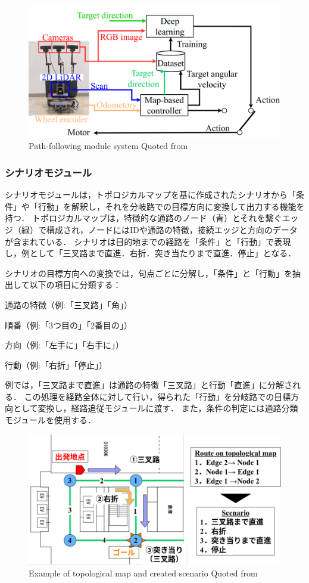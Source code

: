 \begin{figure}[htbp]
  \centering
   \includegraphics[width=130mm]{images/pdf/haruyama/pathfollow_sys.pdf}
   \caption{Path-following module system Quoted from \cite{haruyama2023}}
   \label{fig:pathfollow}
\end{figure}

\subsubsection{シナリオモジュール}
シナリオモジュールは，トポロジカルマップを基に作成されたシナリオから「条件」や「行動」を解釈し，それを分岐路での目標方向に変換して出力する機能を持つ．
トポロジカルマップは，特徴的な通路のノード（青）とそれを繋ぐエッジ（緑）で構成され，ノードにはIDや通路の特徴，接続エッジと方向のデータが含まれている．
シナリオは目的地までの経路を「条件」と「行動」で表現し，例として「三叉路まで直進．右折．突き当たりまで直進．停止」となる．

シナリオの目標方向への変換では，句点ごとに分解し，「条件」と「行動」を抽出して以下の項目に分類する：

通路の特徴（例:「三叉路」「角」）

順番（例:「3つ目の」「2番目の」）

方向（例:「左手に」「右手に」）

行動（例:「右折」「停止」）

例では，「三叉路まで直進」は通路の特徴「三叉路」と行動「直進」に分解される．
この処理を経路全体に対して行い，得られた「行動」を分岐路での目標方向として変換し，経路追従モジュールに渡す．
また，条件の判定には通路分類モジュールを使用する．

\begin{figure}[htbp]
  \centering
   \includegraphics[width=130mm]{images/pdf/haruyama/scenario.pdf}
   \caption{ Example of topological map and created scenario Quoted from \cite{haruyama2023}}
   \label{fig:scenario}
\end{figure}

